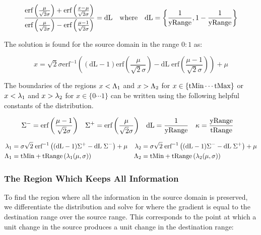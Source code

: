 \begin{equation}\label{eq:0to1}
 \frac{\text{erf}\left(\frac{\mu }{\sqrt{2} \sigma }\right)+\text{erf}\left(\frac{x-\mu }{\sqrt{2} \sigma }\right)}{\text{erf}\left(\frac{\mu }{\sqrt{2} \sigma }\right)-\text{erf}\left(\frac{\mu -1}{\sqrt{2} \sigma }\right)}=\text{dL} \quad \text{where} \quad \text{dL} = \left\{ \frac{1}{\text{yRange}}, 1 - \frac{1}{\text{yRange}} \right\}
\end{equation}


The solution is found for the source domain in the range $0:1$ as:


\begin{equation}\label{eq:LowHigh}
 x = \sqrt{2} \sigma  \text{erf}^{-1}\left((\text{dL}-1) \text{erf}\left(\frac{\mu }{\sqrt{2} \sigma }\right)-\text{dL} \; \text{erf}\left(\frac{\mu -1}{\sqrt{2} \sigma }\right)\right)+\mu
\end{equation}


The boundaries of the regions $x < \Lambda_1 $ and $ x > \Lambda_2$ for $x \in \{\text{tMin} \cdots \text{tMax} \}$ or $x< \lambda_1$  and $ x > \lambda_2$ for $x \in \{0 \cdots 1 \}$ can be written using the following helpful constants of the distribution.

\begin{align}\label{eq:DistributionConstants}
\Sigma^- &= \text{erf}\left(\frac{\mu -1}{\sqrt{2} \sigma }\right) &
 \Sigma^+ &= \text{erf}\left(\frac{\mu }{\sqrt{2} \sigma }\right) &
  \text{dL} &= \frac{1}{\text{yRange}} &
  \kappa &= \frac{\text{yRange}}{\text{tRange}} 
\end{align}

\begin{equation}\label{eq:DiscardedRegionBounds}
\begin{aligned}
\lambda_1 &= \sigma \sqrt{2} \; \text{erf}^{-1}\left((\text{dL}-1) \Sigma^+-\text{dL} \; \Sigma^-\right)+\mu  &            
\lambda_2 &= \sigma \sqrt{2} \; \text{erf}^{-1}\left((\text{dL}-1) \Sigma^- -\text{dL} \; \Sigma^+ \right)+\mu \\
\Lambda_1&= \text{tMin} + \text{tRange} \left( \lambda_1(\mu,\sigma) \right) & 
\Lambda_2 &= \text{tMin} + \text{tRange} \left( \lambda_2(\mu,\sigma) \right)
\end{aligned}
\end{equation}

\subsubsection{The Region Which Keeps All Information}
To find the region where all the information in the source domain is preserved, we differentiate the distribution and solve for where the gradient is equal to the destination range over the source range. This corresponds to the point at which a unit change in the source produces a unit change in the destination range:

